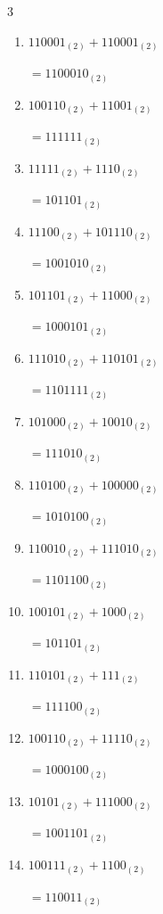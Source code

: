 \begin{multicols}{3}
\begin{enumerate}
  \item $110001_{(2)} + 110001_{(2)}$

        $=1100010_{(2)}$

  \item $100110_{(2)} + 11001_{(2)}$

        $=111111_{(2)}$

  \item $11111_{(2)} + 1110_{(2)}$

        $=101101_{(2)}$

  \item $11100_{(2)} + 101110_{(2)}$

        $=1001010_{(2)}$

  \item $101101_{(2)} + 11000_{(2)}$

        $=1000101_{(2)}$

  \item $111010_{(2)} + 110101_{(2)}$

        $=1101111_{(2)}$

  \item $101000_{(2)} + 10010_{(2)}$

        $=111010_{(2)}$

\columnbreak %

  \item $110100_{(2)} + 100000_{(2)}$

        $=1010100_{(2)}$

  \item $110010_{(2)} + 111010_{(2)}$

        $=1101100_{(2)}$

  \item $100101_{(2)} + 1000_{(2)}$

        $=101101_{(2)}$

  \item $110101_{(2)} + 111_{(2)}$

        $=111100_{(2)}$

  \item $100110_{(2)} + 11110_{(2)}$

        $=1000100_{(2)}$

  \item $10101_{(2)} + 111000_{(2)}$

        $=1001101_{(2)}$

  \item $100111_{(2)} + 1100_{(2)}$

        $=110011_{(2)}$


\end{enumerate}
\end{multicols}
